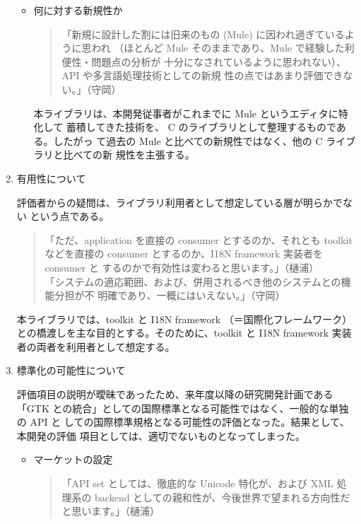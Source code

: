 \begin{enumerate}
\begin{itemize}
\item 何に対する新規性か

\begin{quote}
「新規に設計した割には旧来のもの (Mule) に因われ過ぎているように思われ
（ほとんど Mule そのままであり、Mule で経験した利便性・問題点の分析が
十分になされているように思われない）、API や多言語処理技術としての新規
性の点ではあまり評価できない。」（守岡）
\end{quote}

本ライブラリは、本開発従事者がこれまでに Mule というエディタに特化して
蓄積してきた技術を、 C のライブラリとして整理するものである。したがっ
て過去の Mule と比べての新規性ではなく、他の C ライブラリと比べての新
規性を主張する。

\end{itemize}

\item  有用性について

評価者からの疑問は、ライブラリ利用者として想定している層が明らかでない
という点である。

\begin{quote}
 「ただ、application を直接の consumer とするのか、それとも toolkit
 などを直接の consumer とするのか、I18N framework 実装者を consumer と
 するのかで有効性は変わると思います。」（樋浦）\\
「システムの適応範囲、および、併用されるべき他のシステムとの機能分担が不
明確であり、一概にはいえない。」（守岡）
\end{quote}

本ライブラリでは、toolkit と I18N framework （＝国際化フレームワーク）
との橋渡しを主な目的とする。そのために、toolkit と I18N framework 実装
者の両者を利用者として想定する。

\item 標準化の可能性について

評価項目の説明が曖昧であったため、来年度以降の研究開発計画である「GTK 
との統合」としての国際標準となる可能性ではなく、一般的な単独の API と
しての国際標準規格となる可能性の評価となった。結果として、本開発の評価
項目としては、適切でないものとなってしまった。

\begin{itemize}
\item マーケットの設定

 \begin{quote}
 「API set としては、徹底的な Unicode 特化が、および XML 処理系の 
 backend としての親和性が、今後世界で望まれる方向性だと思います。」（樋浦）
 \end{quote}


\end{itemize}
\end{enumerate}
